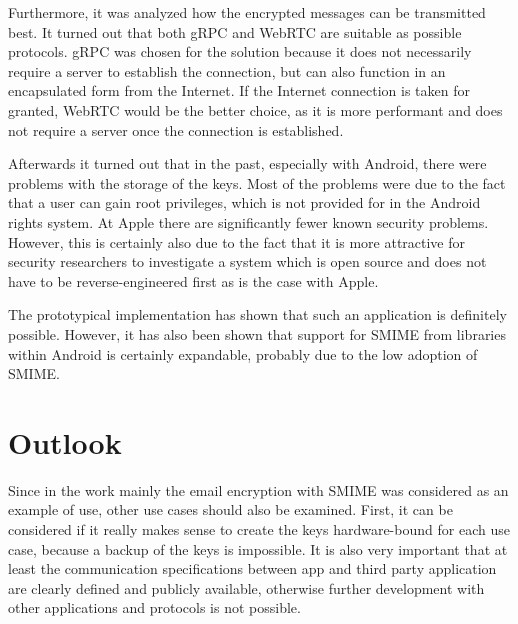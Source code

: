 \documentclass[12pt,oneside,a4paper,parskip]{scrbook}
\begin{document}
Furthermore, it was analyzed how the encrypted messages can be transmitted best. It turned out that both gRPC and WebRTC are suitable as possible protocols. gRPC was chosen for the solution because it does not necessarily require a server to establish the connection, but can also function in an encapsulated form from the Internet. If the Internet connection is taken for granted, WebRTC would be the better choice, as it is more performant and does not require a server once the connection is established. 

Afterwards it turned out that in the past, especially with Android, there were problems with the storage of the keys. Most of the problems were due to the fact that a user can gain root privileges, which is not provided for in the Android rights system. At Apple there are significantly fewer known security problems. However, this is certainly also due to the fact that it is more attractive for security researchers to investigate a system which is open source and does not have to be reverse-engineered first as is the case with Apple.

The prototypical implementation has shown that such an application is definitely possible. However, it has also been shown that support for SMIME from libraries within Android is certainly expandable, probably due to the low adoption of SMIME. 
\section{Outlook}
Since in the work mainly the email encryption with SMIME was considered as an example of use, other use cases should also be examined. First, it can be considered if it really makes sense to create the keys hardware-bound for each use case, because a backup of the keys is impossible. It is also very important that at least the communication specifications between app and third party application are clearly defined and publicly available, otherwise further development with other applications and protocols is not possible.

\backmatter

\listoffigures
{}


\end{document}
